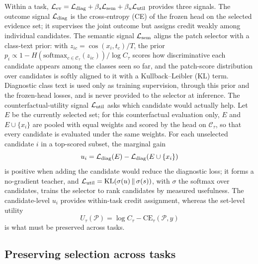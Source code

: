 \documentclass{article}
\def\L{{\cal L}}
\newcommand{\Cls}{\mathcal{C}}
\newcommand{\Psel}{\mathcal{P}}
\begin{document}
Within a task, $\L_{\mathrm{ev}}=\L_{\mathrm{diag}}+\beta_s\L_{\mathrm{sem}}+\beta_u\L_{\mathrm{util}}$ provides three signals. The outcome signal $\L_{\mathrm{diag}}$ is the cross-entropy (CE) of the frozen head on the selected evidence set; it supervises the joint outcome but assigns credit weakly among individual candidates. The semantic signal $\L_{\mathrm{sem}}$ aligns the patch selector with a class-text prior: with $z_{ic}=\cos(x_i,t_c)/T$, the prior $p_i\propto 1-H(\mathrm{softmax}_{c\in\Cls_\tau}(z_{ic}))/\log C_\tau$ scores how discriminative each candidate appears among the classes seen so far, and the patch-score distribution over candidates is softly aligned to it with a Kullback--Leibler (KL) term. Diagnostic class text is used only as training supervision, through this prior and the frozen-head losses, and is never provided to the selector at inference. The counterfactual-utility signal $\L_{\mathrm{util}}$ asks which candidate would actually help. Let $E$ be the currently selected set; for this counterfactual evaluation only, $E$ and $E\cup\{x_i\}$ are pooled with equal weights and scored by the head on $\Cls_\tau$, so that every candidate is evaluated under the same weights. For each unselected candidate $i$ in a top-scored subset, the marginal gain
\begin{equation}
u_i
=
\L_{\mathrm{diag}}(E)
-
\L_{\mathrm{diag}}(E\cup\{x_i\})
\label{eq:ui}
\end{equation}
is positive when adding the candidate would reduce the diagnostic loss; it forms a no-gradient teacher, and $\L_{\mathrm{util}}=\mathrm{KL}(\sigma(u)\,\Vert\,\sigma(s))$, with $\sigma$ the softmax over candidates, trains the selector to rank candidates by measured usefulness. The candidate-level $u_i$ provides within-task credit assignment, whereas the set-level utility
\begin{equation}
U_\tau(\Psel)=\log C_\tau-\mathrm{CE}_\tau(\Psel,y)
\label{eq:u}
\end{equation}
is what must be preserved across tasks.

\subsection{Preserving selection across tasks}
\label{ssec:cl}
\end{document}
